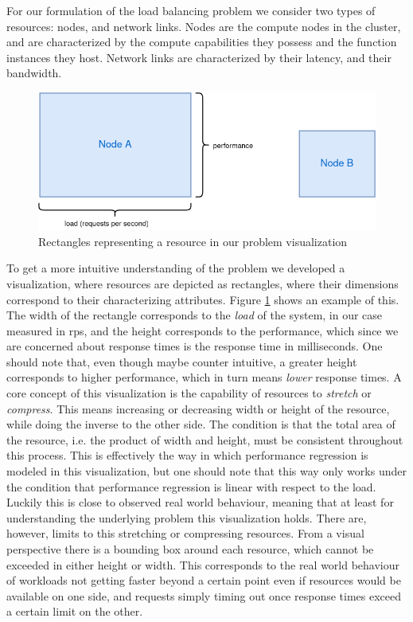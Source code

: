 For our formulation of the load balancing problem we consider two types of resources: nodes, and network links. Nodes are the compute nodes in the cluster, and are characterized by the compute capabilities they possess and the function instances they host. Network links are characterized by their latency, and their bandwidth.
\begin{figure}
    \centering
    \includegraphics[width=12cm]{graphics/diagrams/load_balancer_squares.png}
    \caption{Rectangles representing a resource in our problem visualization}
    \label{fig:lb_squares_basic}
\end{figure}
To get a more intuitive understanding of the problem we developed a visualization, where resources are depicted as rectangles, where their dimensions correspond to their characterizing attributes. Figure \ref{fig:lb_squares_basic} shows an example of this. The width of the rectangle corresponds to the \textit{load} of the system, in our case measured in \gls{rps}, and the height corresponds to the performance, which since we are concerned about response times is the response time in milliseconds. One should note that, even though maybe counter intuitive, a greater height corresponds to higher performance, which in turn means \textit{lower} response times.
A core concept of this visualization is the capability of resources to \textit{stretch} or \textit{compress}. This means increasing or decreasing width or height of the resource, while doing the inverse to the other side. The condition is that the total area of the resource, i.e. the product of width and height, must be consistent throughout this process. This is effectively the way in which performance regression is modeled in this visualization, but one should note that this way only works under the condition that performance regression is linear with respect to the load. Luckily this is close to observed real world behaviour, %
meaning that at least for understanding the underlying problem this visualization holds.
There are, however, limits to this stretching or compressing resources. From a visual perspective there is a bounding box around each resource, which cannot be exceeded in either height or width. This corresponds to the real world behaviour of workloads not getting faster beyond a certain point even if resources would be available on one side, and requests simply timing out once response times exceed a certain limit on the other.
